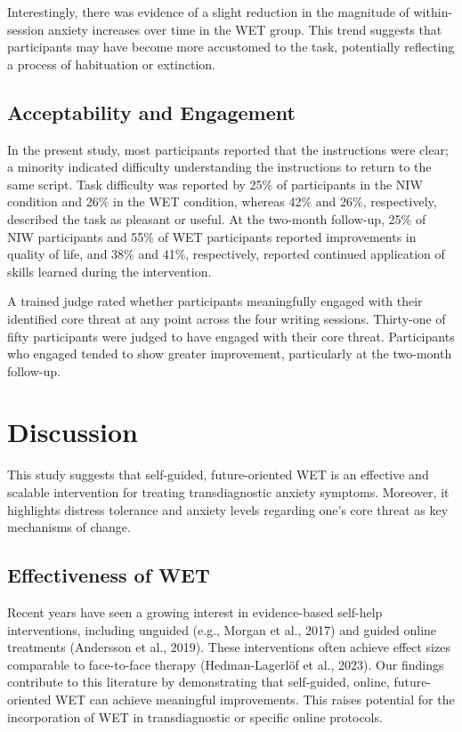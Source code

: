 \documentclass[
  man,floatsintext]{apa7}
\begin{document}
Interestingly, there was evidence of a slight reduction in the magnitude of within-session anxiety increases over time in the WET group.
This trend suggests that participants may have become more accustomed to the task, potentially reflecting a process of habituation or extinction.

\subsection{Acceptability and Engagement}\label{acceptability-and-engagement}

In the present study, most participants reported that the instructions were clear; a minority indicated difficulty understanding the instructions to return to the same script.
Task difficulty was reported by 25\% of participants in the NIW condition and 26\% in the WET condition, whereas 42\% and 26\%, respectively, described the task as pleasant or useful.
At the two-month follow-up, 25\% of NIW participants and 55\% of WET participants reported improvements in quality of life, and 38\% and 41\%, respectively, reported continued application of skills learned during the intervention.

A trained judge rated whether participants meaningfully engaged with their identified core threat at any point across the four writing sessions.
Thirty-one of fifty participants were judged to have engaged with their core threat.
Participants who engaged tended to show greater improvement, particularly at the two-month follow-up.

\section{Discussion}\label{discussion}

This study suggests that self-guided, future-oriented WET is an effective and scalable intervention for treating transdiagnostic anxiety symptoms.
Moreover, it highlights distress tolerance and anxiety levels regarding one's core threat as key mechanisms of change.

\subsection{Effectiveness of WET}\label{effectiveness-of-wet}

Recent years have seen a growing interest in evidence-based self-help interventions, including unguided (e.g., Morgan et al., 2017) and guided online treatments (Andersson et al., 2019).
These interventions often achieve effect sizes comparable to face-to-face therapy (Hedman-Lagerlöf et al., 2023).
Our findings contribute to this literature by demonstrating that self-guided, online, future-oriented WET can achieve meaningful improvements.
This raises potential for the incorporation of WET in transdiagnostic or specific online protocols.
\end{document}
